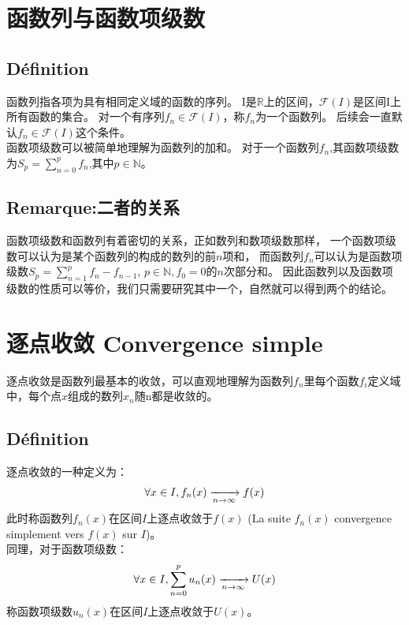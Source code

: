 \documentclass[12pt, a4paper, oneside]{ctexbook}
\begin{document}
\section{函数列与函数项级数}
  \subsection{Définition}
  函数列指各项为具有相同定义域的函数的序列。
  I是$\mathbb{R}$上的区间，$\mathcal{F}(I)$是区间I上所有函数的集合。
  对一个有序列${f_n}\in\mathcal{F}(I)$，称${f_n}$为一个函数列。
  后续会一直默认${f_n}\in\mathcal{F}(I)$这个条件。\\

  函数项级数可以被简单地理解为函数列的加和。
  对于一个函数列${f_n}$,其函数项级数为$S_p=\sum_{n=0}^{p} f_n$,其中$p\in\mathbb{N}$。\\
  \subsection{Remarque:二者的关系}
  函数项级数和函数列有着密切的关系，正如数列和数项级数那样，
  一个函数项级数可以认为是某个函数列的构成的数列的前$n$项和，
  而函数列${f_n}$可以认为是函数项级数$S_p=\sum_{n=1}^{p} f_n-f_{n-1}$, $p\in\mathbb{N}, f_0=0$的$n$次部分和。
  因此函数列以及函数项级数的性质可以等价，我们只需要研究其中一个，自然就可以得到两个的结论。


\section{逐点收敛 Convergence simple}
  逐点收敛是函数列最基本的收敛，可以直观地理解为函数列${f_n}$里每个函数$f_i$定义域中，每个点$x$组成的数列${x}_n$随n都是收敛的。
  \subsection{Définition}
  逐点收敛的一种定义为：
  \begin{equation}
    \notag
    \forall x\in I, f_n(x)\xrightarrow[n\rightarrow\infty]{}f(x)
  \end{equation}
  此时称函数列$f_n(x)$在区间$I$上逐点收敛于$f(x)$ (La suite $f_n(x)$ convergence simplement vers $f(x)$ sur $I$)。\\
  同理，对于函数项级数：
  \begin{equation}
    \notag
    \forall x\in I, \sum_{n=0}^{p} u_n(x)\xrightarrow[n\rightarrow\infty]{}U(x)
  \end{equation}
  称函数项级数$u_n(x)$在区间$I$上逐点收敛于$U(x)$。
  
\end{document}

